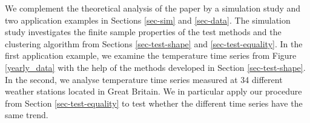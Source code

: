 We complement the theoretical analysis of the paper by a simulation study and two application examples in Sections \ref{sec-sim} and \ref{sec-data}. The simulation study investigates the finite sample properties of the test methods and the clustering algorithm from Sections \ref{sec-test-shape} and \ref{sec-test-equality}. In the first application example, we examine the temperature time series from Figure \ref{yearly_data} with the help of the methods developed in Section \ref{sec-test-shape}. In the second, we analyse temperature time series measured at 34 different weather stations located in Great Britain. We in particular apply our procedure from Section \ref{sec-test-equality} to test whether the different time series have the same trend. 


